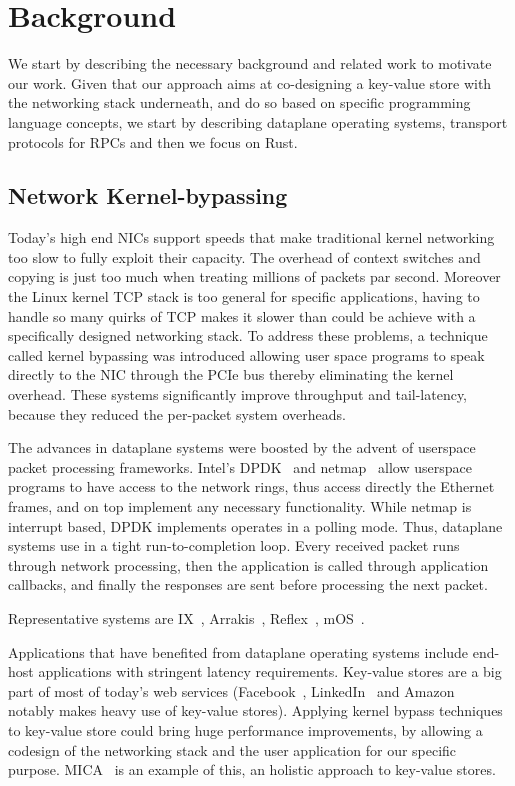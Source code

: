\chapter{Background} \label{chap:background}

We start by describing the necessary background and related work to
motivate our work.
Given that our approach aims at co-designing a key-value store with
the networking stack underneath, and do so based on specific
programming language concepts, we start by describing dataplane
operating systems, transport protocols for RPCs and then we focus on
Rust.


\section{Network Kernel-bypassing}

Today's high end NICs support speeds that make traditional kernel
networking too slow to fully exploit their capacity. The overhead of context
switches and copying is just too much when treating millions of
packets par second. Moreover the Linux kernel TCP stack is too general
for specific applications, having to handle so many quirks of TCP
makes it slower than could be achieve with a specifically designed
networking stack. To address these problems, a technique called kernel
bypassing was introduced allowing user space programs to speak
directly to the NIC through the PCIe bus thereby eliminating the
kernel overhead. These systems significantly improve throughput and
tail-latency, because they reduced the per-packet system overheads.

The advances in dataplane systems were boosted by the advent of
userspace packet processing frameworks. Intel's DPDK~\cite{dpdk} and netmap~\cite{netmap} allow userspace programs to have access to the network rings,
thus access directly the Ethernet frames, and on top implement any
necessary functionality. While netmap is interrupt based, DPDK
implements operates in a polling mode. Thus, dataplane systems use in
a tight run-to-completion loop. Every received packet runs through
network processing, then the application is called through application
callbacks, and finally the responses are sent before processing the
next packet.

Representative systems are IX~\cite{ix}, Arrakis~\cite{arrakis},
Reflex~\cite{reflex}, mOS~\cite{mos}.


Applications that have benefited from dataplane operating systems
include end-host applications with stringent latency requirements.
Key-value stores are a big part of most of today's web services
(Facebook~\cite{memcache-facebook}, LinkedIn~\cite{url:voldemort} and
Amazon~\cite{url:amazon} notably makes heavy use of key-value
stores). Applying kernel bypass techniques to key-value store could
bring huge performance improvements, by allowing a codesign of the
networking stack and the user application for our specific
purpose. MICA~\cite{mica} is an example of this, an holistic approach
to key-value stores.

